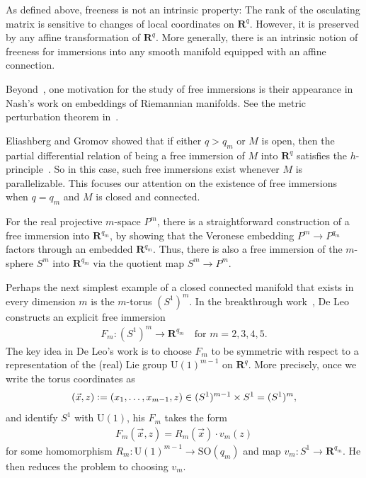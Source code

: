 \documentclass[a4paper,10pt,leqno]{article}
\numberwithin{equation}{section}
\theoremstyle{plain}
\theoremstyle{definition}
\theoremstyle{remark}
\newcommand{\bb}{\mathbf}
\newcommand{\SO}{\mathrm{SO}}
\newcommand{\UL}{\mathrm{U}}
\begin{document}
As defined above, freeness is not an intrinsic property:
The rank of the osculating matrix is sensitive to changes of local coordinates on $\bb{R}^q$.
However, it is preserved by any affine transformation of $\bb{R}^q$.
More generally, there is an intrinsic notion of freeness for immersions into any smooth manifold equipped with an affine connection.

Beyond~\cite{gromov}, one motivation for the study of free immersions is their appearance in Nash's work on embeddings of Riemannian manifolds.
See the metric perturbation theorem in~\cite{nash}. 

Eliashberg and Gromov showed that if either $q > q_m$ or $M$ is open, then the partial differential relation of being a free immersion of $M$ into $\bb{R}^q$ satisfies the $h$-principle~\cite{eg}.
So in this case, such free immersions exist whenever $M$ is parallelizable.
This focuses our attention on the existence of free immersions when $q = q_m$ and $M$ is closed and connected.

For the real projective $m$-space $P^m$, there is a straightforward construction of a free immersion into $\bb{R}^{q_m}$, by showing that the Veronese embedding $P^m \to P^{q_m}$ factors through an embedded $\bb{R}^{q_m}$.
Thus, there is also a free immersion of the $m$-sphere $S^m$ into $\bb{R}^{q_m}$ via the quotient map $S^m \to P^m$.

Perhaps the next simplest example of a closed connected manifold that exists in every dimension $m$ is the $m$-torus $(S^1)^m$.
In the breakthrough work~\cite{deleo}, De Leo constructs an explicit free immersion
\begin{align} 
F_m \colon (S^1)^m \to \bb{R}^{q_m}
	\quad\text{for $m = 2, 3, 4, 5$}.
\end{align} 
The key idea in De Leo's work is to choose $F_m$ to be symmetric with respect to a representation of the (real) Lie group $\UL(1)^{m - 1}$ on $\bb{R}^q$.
More precisely, once we write the torus coordinates as 
\begin{align} 
(\vec{x}, z) \vcentcolon= (x_1, \ldots, x_{m - 1}, z) \in (S^1)^{m - 1} \times S^1 = (S^1)^m,
\end{align} 
and identify $S^1$ with $\UL(1)$, his $F_m$ takes the form
\begin{align}
F_m(\vec{x}, z) = R_m(\vec{x}) \cdot v_m(z)
\end{align}
for some homomorphism $R_m \colon \UL(1)^{m - 1} \to \SO(q_m)$ and map $v_m \colon S^1 \to \bb{R}^{q_m}$.
He then reduces the problem to choosing $v_m$.
\end{document}
